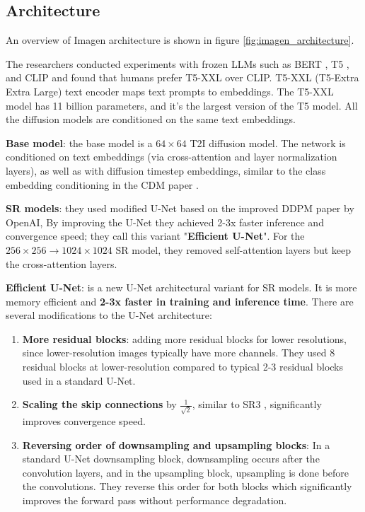 \subsection{Architecture}

An overview of Imagen architecture is shown in figure \ref{fig:imagen_architecture}.

The researchers conducted experiments with frozen LLMs such as BERT \cite{bert}, T5 \cite{t5_model}, and CLIP \cite{openai_clip} and found that humans prefer T5-XXL over CLIP. T5-XXL (T5-Extra Extra Large) text encoder maps text prompts to embeddings. The T5-XXL model has 11 billion parameters, and it's the largest version of the T5 model. All the diffusion models are conditioned on the same text embeddings.

\textbf{Base model}: the base model is a $64\times 64$ T2I diffusion model. The network is conditioned on text embeddings (via cross-attention and layer normalization layers), as well as with diffusion timestep embeddings, similar to the class embedding conditioning in the CDM paper \cite{cascaded_diffusion_models}.

\textbf{SR models}: they used modified U-Net based on the improved DDPM paper \cite{openai_improved_ddpm} by OpenAI, By improving the U-Net they achieved 2-3x faster inference and convergence speed; they call this variant "\textbf{Efficient U-Net}". For the $256\times 256 \rightarrow 1024\times 1024$ SR model, they removed self-attention layers but keep the cross-attention layers.

\textbf{Efficient U-Net}: is a new U-Net architectural variant for SR models. It is more memory efficient and \textbf{2-3x faster in training and inference time}. There are several modifications to the U-Net architecture:

\begin{enumerate}
    \item \textbf{More residual blocks}: adding more residual blocks for lower resolutions, since lower-resolution images typically have more channels. They used 8 residual blocks at lower-resolution compared to typical 2-3 residual blocks used in a standard U-Net.
    \item \textbf{Scaling the skip connections} by $\frac{1}{\sqrt{2}}$, similar to SR3 \cite{sr3}, significantly improves convergence speed.
    \item \textbf{Reversing order of downsampling and upsampling blocks}: In a standard U-Net downsampling block, downsampling occurs after the convolution layers, and in the upsampling block, upsampling is done before the convolutions. They reverse this order for both blocks which significantly improves the forward pass without performance degradation.
\end{enumerate}

